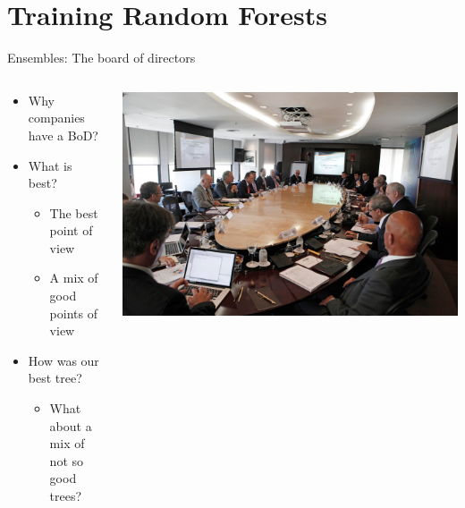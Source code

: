 \section{Training Random Forests}

\begin{frame}{Ensembles: The board of directors}
    \begin{columns}
     \begin{column}{.49\textwidth}
        \begin{itemize}
            \item Why companies have a BoD?
            \item What is best?
            \begin{itemize}
                \item The best point of view
                \item A mix of good points of view
            \end{itemize}
            \newline{}
            \item How was our best tree?
            \begin{itemize}
                \item What about a mix of not so good trees?
            \end{itemize}

        \end{itemize}

     \end{column}
    
     \begin{column}{.49\textwidth}
        \includegraphics[scale=.12]{images/bod}
     \end{column}
    \end{columns}
\end{frame}

